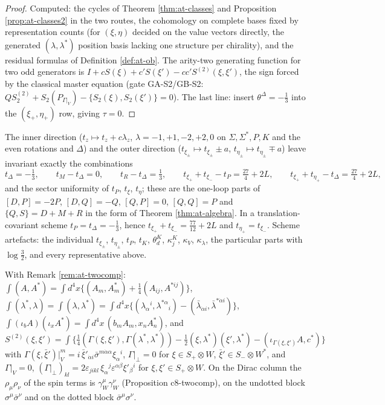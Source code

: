 \begin{proof}
Computed: the cycles of Theorem \ref{thm:at-classes} and Proposition \ref{prop:at-classes2} in the two routes, the cohomology on complete bases fixed by representation counts (for $(\xi,\eta)$ decided on the value vectors directly, the generated $(\lambda,\lambda^*)$ position basis lacking one structure per chirality), and the residual formulas of Definition \ref{def:at-ob}. The arity-two generating function for two odd generators is $I+cS(\xi)+c'S(\xi')-cc'S^{(2)}(\xi,\xi')$, the sign forced by the classical master equation (gate GA-S2/GB-S2: $QS^{(2)}_2+S_2(P_{\Gamma|_V})-\{S_2(\xi),S_2(\xi')\}=0$). The last line: insert $\theta^\Delta=-\tfrac13$ into the $(\xi_+,\eta_+)$ row, giving $\tau=0$.
\end{proof}

\begin{corollary}
\label{cor:at-c-inv}
The inner direction ($t_z\mapsto t_z+c\lambda_z$, $\lambda=-1,+1,-2,+2,0$ on $\Sigma,\Sigma^*,P,K$ and the even rotations and $\Delta$) and the outer direction ($t_{\xi_\pm}\mapsto t_{\xi_\pm}\pm a$, $t_{\eta_\pm}\mapsto t_{\eta_\pm}\mp a$) leave invariant exactly the combinations
\[
t_\Delta=-\tfrac13,\qquad t_M-t_\Delta=0,\qquad t_R-t_\Delta=\tfrac13,\qquad t_{\xi_+}+t_{\xi_-}-t_P=\tfrac{27}4+2L,\qquad t_{\xi_+}+t_{\eta_+}-t_\Delta=\tfrac{27}4+2L,
\]
and the sector uniformity of $t_P$, $t_\xi$, $t_\eta$; these are the one-loop parts of $[D,P]=-2P$, $[D,Q]=-Q$, $[Q,P]=0$, $[Q,Q]=P$ and $\{Q,S\}=D+M+R$ in the form of Theorem \ref{thm:at-algebra}. In a translation-covariant scheme $t_P=t_\Delta=-\tfrac13$, hence $t_{\xi_+}+t_{\xi_-}=\tfrac{77}{12}+2L$ and $t_{\eta_+}=t_{\xi_-}$. Scheme artefacts: the individual $t_{\xi_\pm}$, $t_{\eta_\pm}$, $t_P$, $t_K$, $\theta^K_d$, $\kappa^K_j$, $\kappa_V$, $\kappa_\lambda$, the particular parts with $\log\tfrac32$, and every representative above.
\end{corollary}

\begin{remark}
\label{rem:at-c-tc}
With Remark \ref{rem:at-twocomp}: $\int(A,A^*)=\int d^4x\{(A_m,A^*_m)+\tfrac14(A_{ij},A^{*ij})\}$, $\int(\lambda^*,\lambda)=\int(\lambda,\lambda^*)=\int d^4x\{(\lambda_\alpha{}^i,\lambda^{*\alpha}{}_i)-(\bar\lambda_{\dot\alpha i},\bar\lambda^{*\dot\alpha i})\}$, $\int(\iota_bA)(\iota_xA^*)=\int d^4x\,(b_mA_m,x_nA^*_n)$, and $S^{(2)}(\xi,\xi')=\int\{\tfrac14(\Gamma(\xi,\xi'),\Gamma(\lambda^*,\lambda^*))-\tfrac12(\xi,\lambda^*)(\xi',\lambda^*)-(\iota_{\Gamma(\xi,\xi')}A,c^*)\}$ with $\Gamma(\xi,\bar\xi')|_V^m=i\,\bar\xi'_{\dot\alpha i}\bar\sigma^{m\dot\alpha\alpha}\xi_\alpha{}^i$, $\Gamma|_\perp=0$ for $\xi\in S_+\otimes W$, $\bar\xi'\in S_-\otimes W^*$, and $\Gamma|_V=0$, $(\Gamma|_\perp)_{kl}=2\varepsilon_{jikl}\,\xi_\alpha{}^j\varepsilon^{\alpha\beta}\xi'_\beta{}^i$ for $\xi,\xi'\in S_+\otimes W$. On the Dirac column the $\rho_\mu\rho_\nu$ of the spin terms is $\gamma^\mu_W\gamma^\nu_W$ (Proposition c8-twocomp), on the undotted block $\sigma^\mu\bar\sigma^\nu$ and on the dotted block $\bar\sigma^\mu\sigma^\nu$.
\end{remark}


